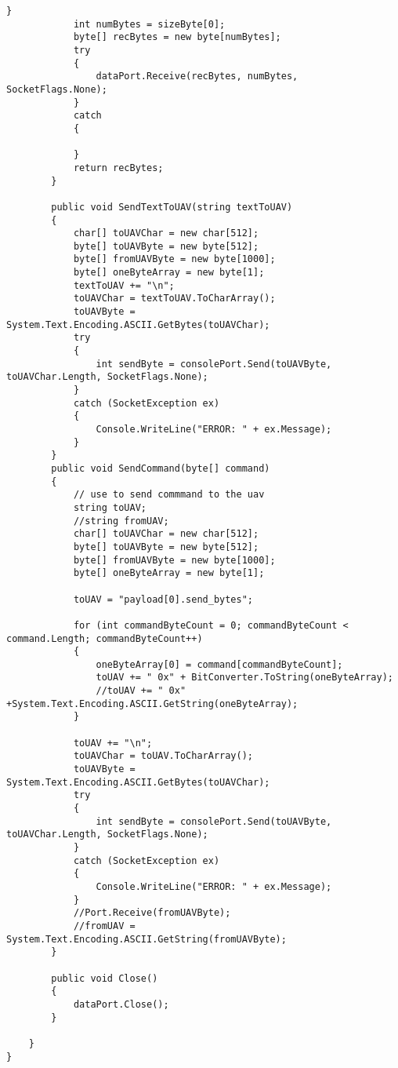 \begin{lstlisting}[caption=\texttt{UAVConnector} Class, label=appen:UAVConnector]
            }
            int numBytes = sizeByte[0];
            byte[] recBytes = new byte[numBytes];
            try
            {
                dataPort.Receive(recBytes, numBytes, SocketFlags.None);
            }
            catch
            { 
                
            }
            return recBytes;
        }

        public void SendTextToUAV(string textToUAV)
        {
            char[] toUAVChar = new char[512];
            byte[] toUAVByte = new byte[512];
            byte[] fromUAVByte = new byte[1000];
            byte[] oneByteArray = new byte[1];
            textToUAV += "\n";
            toUAVChar = textToUAV.ToCharArray();
            toUAVByte = System.Text.Encoding.ASCII.GetBytes(toUAVChar);
            try
            {
                int sendByte = consolePort.Send(toUAVByte, toUAVChar.Length, SocketFlags.None);
            }
            catch (SocketException ex)
            {
                Console.WriteLine("ERROR: " + ex.Message);
            }
        }
        public void SendCommand(byte[] command)
        {
            // use to send commmand to the uav
            string toUAV;
            //string fromUAV;
            char[] toUAVChar = new char[512];
            byte[] toUAVByte = new byte[512];
            byte[] fromUAVByte = new byte[1000];
            byte[] oneByteArray = new byte[1];

            toUAV = "payload[0].send_bytes";

            for (int commandByteCount = 0; commandByteCount < command.Length; commandByteCount++)
            {
                oneByteArray[0] = command[commandByteCount];
                toUAV += " 0x" + BitConverter.ToString(oneByteArray);
                //toUAV += " 0x" +System.Text.Encoding.ASCII.GetString(oneByteArray); 
            }

            toUAV += "\n";
            toUAVChar = toUAV.ToCharArray();
            toUAVByte = System.Text.Encoding.ASCII.GetBytes(toUAVChar);
            try
            {
                int sendByte = consolePort.Send(toUAVByte, toUAVChar.Length, SocketFlags.None);
            }
            catch (SocketException ex)
            {
                Console.WriteLine("ERROR: " + ex.Message);
            }
            //Port.Receive(fromUAVByte);
            //fromUAV = System.Text.Encoding.ASCII.GetString(fromUAVByte);
        }

        public void Close()
        {
            dataPort.Close();
        }

    }
}
\end{lstlisting}
